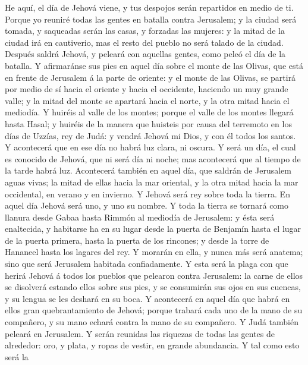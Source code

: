  He aquí, el día de Jehová viene, y tus despojos serán
repartidos en medio de ti.  Porque yo reuniré todas las
gentes en batalla contra Jerusalem; y la ciudad será tomada, y saqueadas
serán las casas, y forzadas las mujeres: y la mitad de la ciudad irá en
cautiverio, mas el resto del pueblo no será talado de la ciudad.
 Después saldrá Jehová, y peleará con aquellas gentes,
como peleó el día de la batalla.  Y afirmaránse sus pies
en aquel día sobre el monte de las Olivas, que está en frente de
Jerusalem á la parte de oriente: y el monte de las Olivas, se partirá
por medio de sí hacia el oriente y hacia el occidente, haciendo un muy
grande valle; y la mitad del monte se apartará hacia el norte, y la otra
mitad hacia el mediodía.  Y huiréis al valle de los
montes; porque el valle de los montes llegará hasta Hasal; y huiréis de
la manera que huisteis por causa del terremoto en los días de Uzzías,
rey de Judá: y vendrá Jehová mi Dios, y con él todos los santos.
 Y acontecerá que en ese día no habrá luz clara, ni
oscura.  Y será un día, el cual es conocido de Jehová, que
ni será día ni noche; mas acontecerá que al tiempo de la tarde habrá
luz.  Acontecerá también en aquel día, que saldrán de
Jerusalem aguas vivas; la mitad de ellas hacia la mar oriental, y la
otra mitad hacia la mar occidental, en verano y en invierno.
 Y Jehová será rey sobre toda la tierra. En aquel día
Jehová será uno, y uno su nombre.  Y toda la tierra se
tornará como llanura desde Gabaa hasta Rimmón al mediodía de Jerusalem:
y ésta será enaltecida, y habitarse ha en su lugar desde la puerta de
Benjamín hasta el lugar de la puerta primera, hasta la puerta de los
rincones; y desde la torre de Hananeel hasta los lagares del rey.
 Y morarán en ella, y nunca más será anatema; sino que
será Jerusalem habitada confiadamente.  Y esta será la
plaga con que herirá Jehová á todos los pueblos que pelearon contra
Jerusalem: la carne de ellos se disolverá estando ellos sobre sus pies,
y se consumirán sus ojos en sus cuencas, y su lengua se les deshará en
su boca.  Y acontecerá en aquel día que habrá en ellos
gran quebrantamiento de Jehová; porque trabará cada uno de la mano de su
compañero, y su mano echará contra la mano de su compañero.
 Y Judá también peleará en Jerusalem. Y serán reunidas
las riquezas de todas las gentes de alrededor: oro, y plata, y ropas de
vestir, en grande abundancia.  Y tal como esto será la
